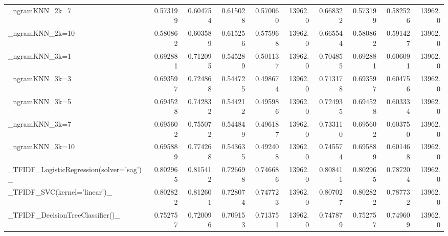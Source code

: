 \begin{tabular}{lrrrrrrrrr}
\_ngramKNN\_2k=7                                     &  0.573199 &         0.604754 &      0.615028 &        0.570060 &        13962.0 &            0.668322 &         0.573199 &           0.582526 &           13962.0 \\
\_ngramKNN\_2k=10                                    &  0.580862 &         0.603589 &      0.615256 &        0.575968 &        13962.0 &            0.665544 &         0.580862 &           0.591427 &           13962.0 \\
\_ngramKNN\_3k=1                                     &  0.692881 &         0.712095 &      0.545289 &        0.501137 &        13962.0 &            0.704855 &         0.692881 &           0.606091 &           13962.0 \\
\_ngramKNN\_3k=3                                     &  0.693597 &         0.724868 &      0.544725 &        0.498674 &        13962.0 &            0.713178 &         0.693597 &           0.604756 &           13962.0 \\
\_ngramKNN\_3k=5                                     &  0.694528 &         0.742832 &      0.544212 &        0.495986 &        13962.0 &            0.724935 &         0.694528 &           0.603334 &           13962.0 \\
\_ngramKNN\_3k=7                                     &  0.695602 &         0.755072 &      0.544849 &        0.496187 &        13962.0 &            0.733110 &         0.695602 &           0.603750 &           13962.0 \\
\_ngramKNN\_3k=10                                    &  0.695889 &         0.774268 &      0.543635 &        0.492408 &        13962.0 &            0.745574 &         0.695889 &           0.601468 &           13962.0 \\
\_TFIDF\_LogisticRegression(solver='sag')\_           &  0.802965 &         0.815412 &      0.726698 &        0.746686 &        13962.0 &            0.808411 &         0.802965 &           0.787204 &           13962.0 \\
\_TFIDF\_SVC(kernel='linear')\_                       &  0.802822 &         0.812601 &      0.728074 &        0.747723 &        13962.0 &            0.807027 &         0.802822 &           0.787732 &           13962.0 \\
\_TFIDF\_DecisionTreeClassifier()\_                   &  0.752757 &         0.720096 &      0.709153 &        0.713751 &        13962.0 &            0.747879 &         0.752757 &           0.749609 &           13962.0 \\

\end{tabular}
